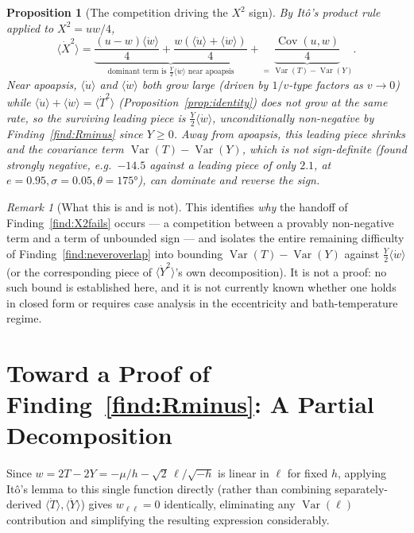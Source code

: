\documentclass[12pt]{amsart}
\theoremstyle{plain}
\newtheorem{proposition}[theorem]{Proposition}
\theoremstyle{remark}
\newtheorem*{remark}{Remark}
\begin{document}
\begin{proposition}[The competition driving the $X^2$ sign]\label{prop:mechanism}
By It\^o's product rule applied to $X^2=uw/4$,
\begin{equation}
\langle\dot X^2\rangle = \underbrace{\frac{(u-w)\langle\dot w\rangle}{4} + \frac{w(\langle\dot u\rangle+\langle\dot w\rangle)}{4}}_{\text{dominant term is }\frac{Y}{2}\langle\dot w\rangle\text{ near apoapsis}} + \underbrace{\frac{\operatorname{Cov}(u,w)}{4}}_{=\,\operatorname{Var}(T)-\operatorname{Var}(Y)}. \tag{4}
\end{equation}
Near apoapsis, $\langle\dot u\rangle$ and $\langle\dot w\rangle$ both grow large (driven by $1/v$-type factors as $v\to0$) while $\langle\dot u\rangle+\langle\dot w\rangle=\langle\dot T^2\rangle$ (Proposition~\ref{prop:identity}) does not grow at the same rate, so the surviving leading piece is $\tfrac{Y}{2}\langle\dot w\rangle$, unconditionally non-negative by Finding~\ref{find:Rminus} since $Y\geq0$. Away from apoapsis, this leading piece shrinks and the covariance term $\operatorname{Var}(T)-\operatorname{Var}(Y)$, which is not sign-definite (found strongly negative, e.g.\ $-14.5$ against a leading piece of only $2.1$, at $e=0.95,\sigma=0.05,\theta=175°$), can dominate and reverse the sign.
\end{proposition}

\begin{remark}[What this is and is not]
This identifies \emph{why} the handoff of Finding~\ref{find:X2fails} occurs --- a competition between a provably non-negative term and a term of unbounded sign --- and isolates the entire remaining difficulty of Finding~\ref{find:neveroverlap} into bounding $\operatorname{Var}(T)-\operatorname{Var}(Y)$ against $\tfrac{Y}{2}\langle\dot w\rangle$ (or the corresponding piece of $\langle\dot Y^2\rangle$'s own decomposition). It is not a proof: no such bound is established here, and it is not currently known whether one holds in closed form or requires case analysis in the eccentricity and bath-temperature regime.
\end{remark}

\section{Toward a Proof of Finding~\ref{find:Rminus}: A Partial Decomposition}

Since $w=2T-2Y=-\mu/h-\sqrt2\,\ell/\sqrt{-h}$ is linear in $\ell$ for fixed $h$, applying It\^o's lemma to this single function directly (rather than combining separately-derived $\langle\dot T\rangle,\langle\dot Y\rangle$) gives $w_{\ell\ell}=0$ identically, eliminating any $\operatorname{Var}(\ell)$ contribution and simplifying the resulting expression considerably.
\end{document}
